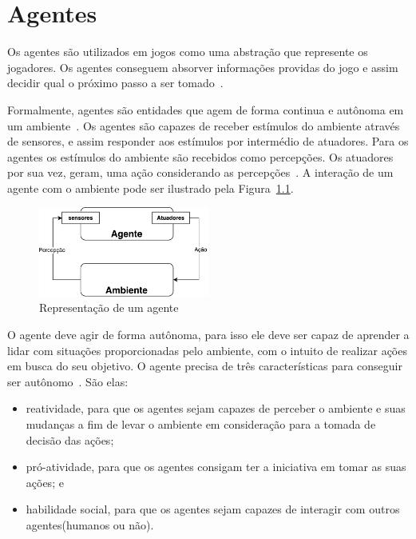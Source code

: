 \chapter{\label{chap:agentes}Agentes} 

Os agentes são utilizados em jogos como uma abstração que represente os jogadores. Os agentes conseguem absorver informações providas do jogo e assim decidir qual o próximo passo a ser tomado~\cite{millington2009artificial}. 

Formalmente, agentes são entidades que agem de forma continua e autônoma em um ambiente~\cite{agent1993oriented}. 
Os agentes são capazes de receber estímulos do ambiente através de sensores, e assim responder aos estímulos por intermédio de atuadores. 
Para os agentes os estímulos do ambiente são recebidos como percepções. 
Os atuadores por sua vez, geram, uma ação considerando as percepções~\cite[Capítulo 7]{intelligence2003modern}. 
A interação de um agente com o ambiente pode ser ilustrado pela Figura~\ref{fig:agente}.

\begin{figure}[ht]
	\centering
	\includegraphics[width=0.5\textwidth]{fig/agente.pdf}
	\caption{Representação de um agente}
	\label{fig:agente}
\end{figure} 

O agente deve agir de forma autônoma, para isso ele deve ser capaz de aprender a lidar com situações proporcionadas pelo ambiente, com o intuito de realizar ações em busca do seu objetivo. O agente precisa de três características para conseguir ser autônomo~\cite{agent1999}. São elas:
 
\begin{itemize}
	\item reatividade, para que os agentes sejam capazes de perceber o ambiente e suas mudanças a fim de levar o ambiente em consideração para a tomada de decisão das ações;
	\item pró-atividade, para que os agentes consigam ter a iniciativa em tomar as suas ações; e
	\item habilidade social, para que os agentes sejam capazes de interagir com outros agentes(humanos ou não).
\end{itemize}

